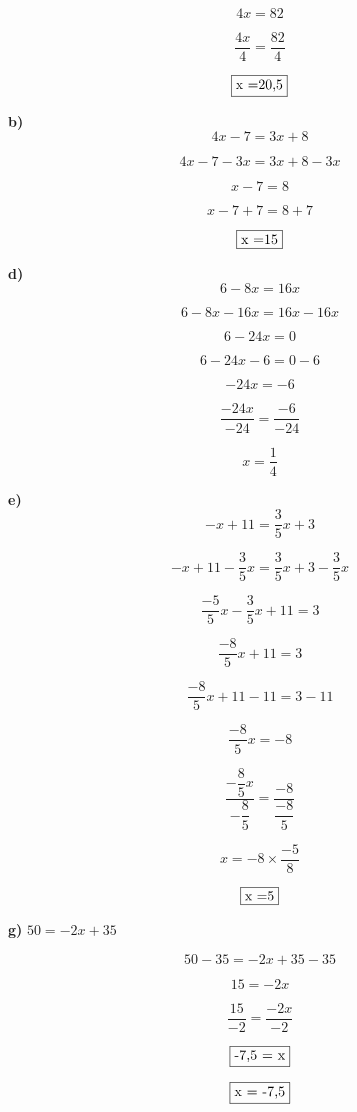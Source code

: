 \documentclass[a4paper,11pt]{article}
\begin{document}
$$ 4x  =  82$$

$$ \dfrac{4x}{4}  =  \dfrac{82}{4}$$

$$\fbox{x =20,5}$$
\color{black}

\textbf{b)} $$4x-7 = 3x+8$$

\color{red}
$$ 4x -7-3x = 3x+8 -3x$$

$$x-7  =  8$$

$$x-7+ 7 =  8+7$$

$$\fbox{x =15}$$
\color{black}






\columnbreak

\textbf{d)} $$6-8x=16x$$

\color{red}
$$ 6-8x-16x= 16x-16x $$

$$ 6-24x  =  0$$

$$ 6-24x -6 =  0-6$$

$$ -24x  =  -6$$

$$ \dfrac{-24x}{-24}  =  \dfrac{-6}{-24}$$

$$x = \dfrac{1}{4}$$

\color{black}


\textbf{e)} $$-x+11 = \dfrac{3}{5} x+3$$

\color{red}
$$ -x+11-\dfrac{3}{5}x = \dfrac{3}{5} x+3 - \dfrac{3}{5}x $$

$$ \dfrac{-5}{5}x -\dfrac{3}{5}x +11  =  3$$

$$ \dfrac{-8}{5}x  +11  =  3$$

$$ \dfrac{-8}{5}x  +11 -11 =  3-11$$

$$ \dfrac{-8}{5}x   =  -8$$

$$ \dfrac{-\dfrac{8}{5}x }{-\dfrac{8}{5}} =  \dfrac{-8}{\dfrac{-8}{5}}$$

$$ x =  -8  \times  \dfrac{-5}{8}$$



$$\fbox{x =5}$$
\color{black}





\columnbreak

\textbf{g)} $50 = -2x + 35$


\color{red}
$$ 50-35= -2x +35 -35$$

$$15  =  -2x$$


$$ \dfrac{15}{-2}  =  \dfrac{-2x}{-2}$$

$$\fbox{-7,5 = x}$$

$$\fbox{x = -7,5}$$

\color{black}
\end{document}
